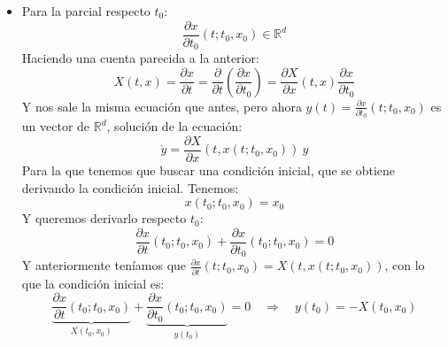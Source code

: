 \begin{itemize}
        Si pensamos ahora que (tenemos que buscar condición inicial para la ecuación superior) tenemos $x(t_0;t_0,x_0) = x_0$, derivando respecto $x_0$ tenemos que\footnote{Recordemos que $x_0\in \mathbb{R}^d$, con lo que $\frac{\partial x_0}{\partial x_0}=Id_d$.}: 
        \begin{equation*}
            \frac{\partial x}{\partial x_0}(t_0;t_0,x_0) = Id_d
        \end{equation*}
        Así, tenemos la condición $Y(t_0) = Id_d$, por lo que $Y$ es la matriz principal fundamental\footnote{Conviene repasar Ecuaciones Diferenciales I.} en $t_0$ de la ecuación matricial anterior.
    \item Para la parcial respecto $t_0$:
        \begin{equation*}
            \frac{\partial x}{\partial t_0}(t;t_0,x_0) \in \mathbb{R}^d
        \end{equation*}
        Haciendo una cuenta parecida a la anterior:
        \begin{equation*}
            X(t,x) = \frac{\partial x}{\partial t} = \frac{\partial }{\partial t}\left(\frac{\partial x}{\partial t_0}\right) = \frac{\partial X}{\partial x}(t,x)\frac{\partial x}{\partial t_0}
        \end{equation*}
        Y nos sale la misma ecuación que antes, pero ahora $y(t) = \frac{\partial x}{\partial t_0}(t;t_0,x_0)$ es un vector de $\mathbb{R}^d$, solución de la ecuación:
        \begin{equation*}
            \dot{y} = \frac{\partial X}{\partial x}(t,x(t;t_0,x_0))\ y
        \end{equation*}
        Para la que tenemos que buscar una condición inicial, que se obtiene derivando la condición inicial. Tenemos:
        \begin{equation*}
            x(t_0;t_0,x_0)=x_0
        \end{equation*}
        Y queremos derivarlo respecto $t_0$:
        \begin{equation*}
            \frac{\partial x}{\partial t}(t_0;t_0,x_0) + \frac{\partial x}{\partial t_0}(t_0;t_0,x_0) = 0
        \end{equation*}
        Y anteriormente teníamos que $\frac{\partial x}{\partial t}(t;t_0,x_0) = X(t,x(t;t_0,x_0))$, con lo que la condición inicial es:
        \begin{equation*}
            \underbrace{\frac{\partial x}{\partial t}(t_0;t_0,x_0)}_{X(t_0,x_0)} + \underbrace{\frac{\partial x}{\partial t_0}(t_0;t_0,x_0)}_{y(t_0)} = 0 \quad\Longrightarrow\quad
            y(t_0) = -X(t_0,x_0)
        \end{equation*}
\end{itemize}

